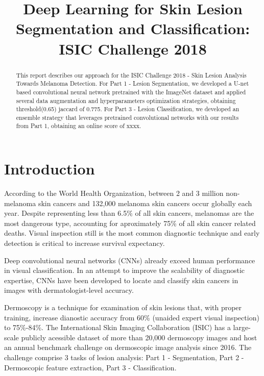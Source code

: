 \documentclass[conference]{IEEEtran}
\begin{document}
\title{Deep Learning for Skin Lesion Segmentation and Classification: ISIC Challenge 2018}

\author{}

\maketitle

\begin{abstract}
This report describes our approach for the ISIC Challenge 2018 - Skin Lesion Analysis Towards Melanoma Detection. For Part 1 - Lesion Segmentation, we developed a U-net based convolutional neural network pretrained with the ImageNet dataset\cite{imagenet} and applied several data augmentation and hyperparameters optimization strategies, obtaining threshold(0.65) jaccard of 0.775. For Part 3 - Lesion Classification, we developed an ensemble strategy that leverages pretrained convolutional networks with our results from Part 1, obtaining an online score of xxxx. 
\end{abstract}

\section{Introduction}

According to the World Health Organization, between 2 and 3 million non-melanoma skin cancers and 132,000 melanoma skin cancers occur globally each year\cite{who}. Despite representing less than 6.5\% of all skin cancers, melanomas are the most dangerous type, accounting for aproximately 75\% of all skin cancer related deaths\cite{who, nature}.  Visual inspection still is the most common diagnostic technique and early detection is critical to increase survival expectancy.

Deep convolutional neural networks (CNNs) already exceed human performance in visual classification\cite{fei}.  In an attempt to improve the scalability of diagnostic expertise, CNNs have been developed to locate and classify skin cancers in images with dermatologist-level accuracy\cite{nature}.

Dermoscopy is a technique for examination of skin lesions that, with proper training, increase dianostic accuracy from 60\% (unaided expert visual inspection) to 75\%-84\%\cite{isic}. The International Skin Imaging Collaboration (ISIC) has a large-scale publicly acessible dataset of more than 20,000 dermoscopy images and host an annual benchmark challenge on dermoscopic image analysis since 2016.  The challenge comprise 3 tasks of lesion analysis: Part 1 - Segmentation, Part 2 - Dermoscopic feature extraction, Part 3 - Classification. 
\end{document}
